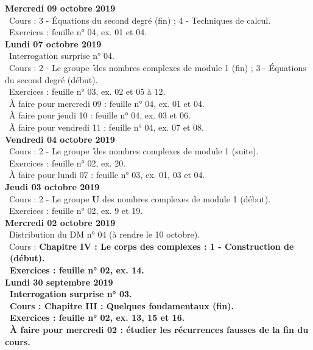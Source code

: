 \documentclass[12pt,a4paper]{article}
\begin{document}
\noindent\textbf{\bf Mercredi 09 octobre 2019}\\
\bu\ Cours : 3 - Équations du second degré (fin) ; 4 - Techniques de calcul.\\
 \bu\ Exercices : feuille n° 04, ex. 01 et 04.\vspace{.4cm}\\

\noindent\textbf{\bf Lundi 07 octobre 2019}\\
\bu\ Interrogation surprise n° 04.\\ 
\bu\ Cours : 2 - Le groupe \U\ des nombres complexes de module 1 (fin) ; 3 - Équations du second 
degré (début).\\
\bu\ Exercices : feuille n° 03, ex. 02 et 05 à 12.\\
\bu\ À faire pour mercredi 09 : feuille n° 04, ex. 01 et 04.\\
\bu\ À faire pour jeudi 10 : feuille n° 04, ex. 03 et 06.\\
\bu\ À faire pour vendredi 11 : feuille n° 04, ex. 07 et 08.\vspace{.4cm}\\

\noindent\textbf{Vendredi 04 octobre 2019}\\
\bu\ Cours : 2 - Le groupe \U\ des nombres complexes de module 1 (suite).\\
\bu\ Exercices : feuille n° 02, ex. 20.\\
\bu\ À faire pour lundi 07 : feuille n° 03, ex. 01, 03 et 04.\vspace{.4cm}\\ 

\noindent\textbf{Jeudi 03 octobre 2019}\\
\bu\ Cours : 2 - Le groupe \textbf{U} des nombres complexes de module 1 (début).\\
 \bu\ Exercices : feuille n° 02, ex. 9 et 19.\vspace{.4cm}\\

\noindent\textbf{\bf Mercredi 02 octobre 2019}\\
\bu\ Distribution du DM n° 04 (à rendre le 10 octobre).\\
\bu\ Cours : \bf Chapitre IV \rm : Le corps des complexes : 1 - Construction de \C\ (début).\\
 \bu\ Exercices : feuille n° 02, ex. 14.\vspace{.4cm}\\

\noindent\textbf{\bf Lundi 30 septembre 2019}\\
 \bu\ Interrogation surprise n° 03.\\
 \bu\ Cours : \bf Chapitre III \rm : Quelques fondamentaux (fin).\\
 \bu\ Exercices : feuille n° 02, ex. 13, 15 et 16.\\
\bu\ À faire pour mercredi 02 : étudier les récurrences fausses de la fin du cours.\vspace{.4cm}\\
\end{document}
